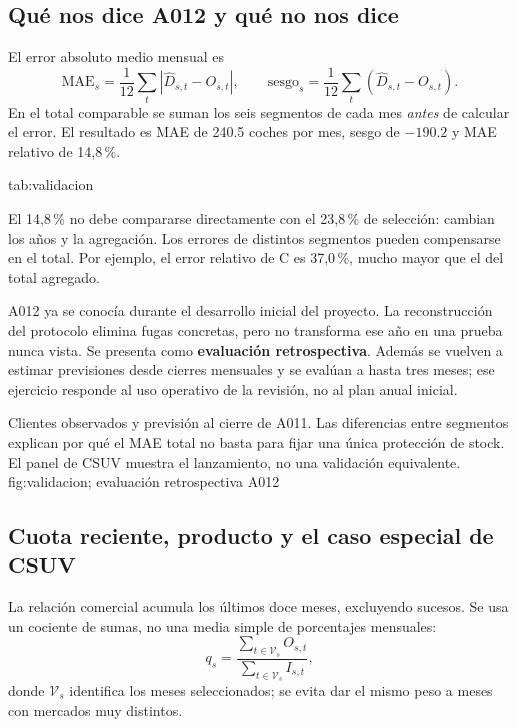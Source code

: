 \subsection{Qué nos dice A012 y qué no nos dice}
El error absoluto medio mensual es
\begin{equation}
 \mathrm{MAE}_s=\frac{1}{12}\sum_t|\widehat D_{s,t}-O_{s,t}|,
 \qquad
 \mathrm{sesgo}_s=\frac{1}{12}\sum_t(\widehat D_{s,t}-O_{s,t}).
\end{equation}
En el total comparable se suman los seis segmentos de cada mes \emph{antes}
de calcular el error. El resultado es MAE de \num{240.5} coches por mes, sesgo
de $-\num{190.2}$ y MAE relativo de 14,8\,\%.

{tab:validacion}{}

El 14,8\,\% no debe compararse directamente con el 23,8\,\% de selección:
cambian los años y la agregación. Los errores de distintos segmentos pueden
compensarse en el total. Por ejemplo, el error relativo de C es 37,0\,\%, mucho
mayor que el del total agregado.

A012 ya se conocía durante el desarrollo inicial del proyecto. La reconstrucción
del protocolo elimina fugas concretas, pero no transforma ese año en una prueba
nunca vista. Se presenta como \textbf{evaluación retrospectiva}. Además se
vuelven a estimar previsiones desde cierres mensuales y se evalúan a hasta tres
meses; ese ejercicio responde al uso operativo de la revisión, no al plan anual
inicial.

{Clientes observados y previsión al cierre de A011. Las diferencias entre segmentos
explican por qué el MAE total no basta para fijar una única protección de stock.
El panel de CSUV muestra el lanzamiento, no una validación equivalente.}
{fig:validacion}{; evaluación retrospectiva A012}

\subsection{Cuota reciente, producto y el caso especial de CSUV}
La relación comercial acumula los últimos doce meses, excluyendo sucesos. Se usa
un cociente de sumas, no una media simple de porcentajes mensuales:
\begin{equation}
 q_s=\frac{\sum_{t\in\mathcal V_s}O_{s,t}}
           {\sum_{t\in\mathcal V_s}I_{s,t}},
\end{equation}
donde $\mathcal V_s$ identifica los meses seleccionados; se evita dar el mismo
peso a meses con mercados muy distintos.

